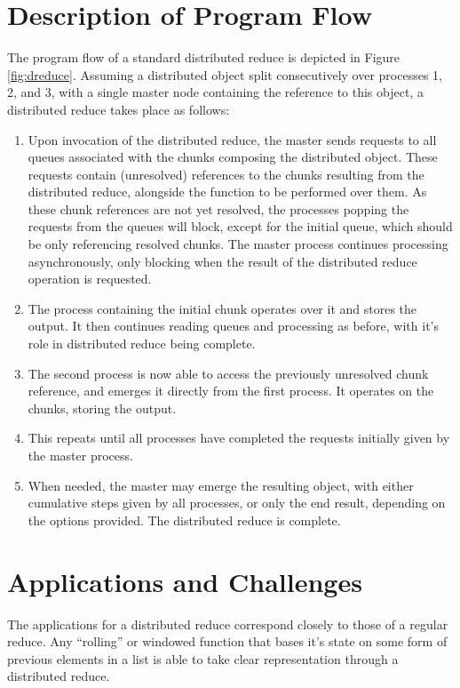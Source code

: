 \documentclass[10pt, a4paper]{article}
\begin{document}
\section{Description of Program Flow}

The program flow of a standard distributed reduce is depicted in Figure \ref{fig:dreduce}.
Assuming a distributed object split consecutively over processes 1, 2, and 3, with a single master node containing the reference to this object, a distributed reduce takes place as follows:
\begin{enumerate}
	\item Upon invocation of the distributed reduce, the master sends requests to all queues associated with the chunks composing the distributed object. These requests contain (unresolved) references to the chunks resulting from the distributed reduce, alongside the function to be performed over them. As these chunk references are not yet resolved, the processes popping the requests from the queues will block, except for the initial queue, which should be only referencing resolved chunks. The master process continues processing asynchronously, only blocking when the result of the distributed reduce operation is requested.
	\item The process containing the initial chunk operates over it and stores the output. It then continues reading queues and processing as before, with it's role in distributed reduce being complete.
	\item The second process is now able to access the previously unresolved chunk reference, and emerges it directly from the first process. It operates on the chunks, storing the output.
	\item This repeats until all processes have completed the requests initially given by the master process.
	\item When needed, the master may emerge the resulting object, with either cumulative steps given by all processes, or only the end result, depending on the options provided. The distributed reduce is complete.
\end{enumerate}

\section{Applications and Challenges}

The applications for a distributed reduce correspond closely to those of a regular reduce.
Any ``rolling'' or windowed function that bases it's state on some form of previous elements in a list is able to take clear representation through a distributed reduce.
\end{document}
